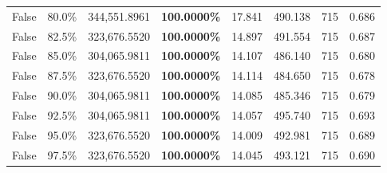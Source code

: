 \begin{table}[H]
\begin{tabular}{lllrllll}
\cline{1-8}
False & 80.0\% & 344,551.8961 & \bfseries \color{red} 100.0000\% & 17.841 & 490.138 & 715 & 0.686 \\
\cline{1-8}
False & 82.5\% & 323,676.5520 & \bfseries \color{red} 100.0000\% & 14.897 & 491.554 & 715 & 0.687 \\
\cline{1-8}
False & 85.0\% & 304,065.9811 & \bfseries \color{red} 100.0000\% & 14.107 & 486.140 & 715 & 0.680 \\
\cline{1-8}
False & 87.5\% & 323,676.5520 & \bfseries \color{red} 100.0000\% & 14.114 & 484.650 & 715 & 0.678 \\
\cline{1-8}
False & 90.0\% & 304,065.9811 & \bfseries \color{red} 100.0000\% & 14.085 & 485.346 & 715 & 0.679 \\
\cline{1-8}
False & 92.5\% & 304,065.9811 & \bfseries \color{red} 100.0000\% & 14.057 & 495.740 & 715 & 0.693 \\
\cline{1-8}
False & 95.0\% & 323,676.5520 & \bfseries \color{red} 100.0000\% & 14.009 & 492.981 & 715 & 0.689 \\
\cline{1-8}
False & 97.5\% & 323,676.5520 & \bfseries \color{red} 100.0000\% & 14.045 & 493.121 & 715 & 0.690 \\
\cline{1-8}
\bottomrule
\end{tabular}
\end{table}
